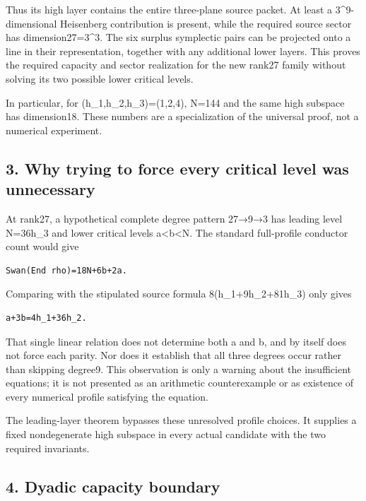 Thus its high layer contains the entire three-plane source packet. At
least a 3\^{}9-dimensional Heisenberg contribution is present, while the
required source sector has dimension27=3\^{}3. The six surplus
symplectic pairs can be projected onto a line in their representation,
together with any additional lower layers. This proves the required
capacity and sector realization for the new rank27 family without
solving its two possible lower critical levels.

In particular, for (h\_1,h\_2,h\_3)=(1,2,4), N=144 and the same high
subspace has dimension18. These numbers are a specialization of the
universal proof, not a numerical experiment.

\hypertarget{odd_capacity-why-trying-to-force-every-critical-level-was-unnecessary}{%
\subsection{3. Why trying to force every critical level was
unnecessary}\label{odd_capacity-why-trying-to-force-every-critical-level-was-unnecessary}}

At rank27, a hypothetical complete degree pattern 27→9→3 has leading
level N=36h\_3 and lower critical levels a\textless b\textless N. The
standard full-profile conductor count would give

\begin{Verbatim}[fontsize=\small,breaklines=true,breakanywhere=true]
Swan(End rho)=18N+6b+2a.
\end{Verbatim}

Comparing with the stipulated source formula 8(h\_1+9h\_2+81h\_3) only
gives

\begin{Verbatim}[fontsize=\small,breaklines=true,breakanywhere=true]
a+3b=4h_1+36h_2.
\end{Verbatim}

That single linear relation does not determine both a and b, and by
itself does not force each parity. Nor does it establish that all three
degrees occur rather than skipping degree9. This observation is only a
warning about the insufficient equations; it is not presented as an
arithmetic counterexample or as existence of every numerical profile
satisfying the equation.

The leading-layer theorem bypasses these unresolved profile choices. It
supplies a fixed nondegenerate high subspace in every actual candidate
with the two required invariants.

\hypertarget{odd_capacity-dyadic-capacity-boundary}{%
\subsection{4. Dyadic capacity
boundary}\label{odd_capacity-dyadic-capacity-boundary}}

